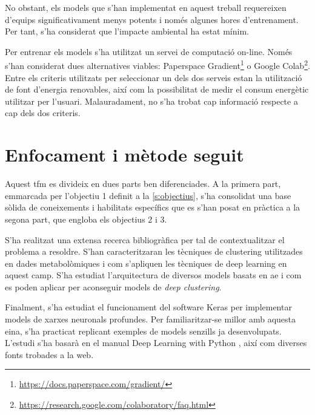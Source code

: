 \documentclass[CAT,BIB]{TFUOC}%
\begin{document}
            No obstant,
            els models que s’han implementat en aquest treball
            requereixen d’equips significativament menys potents
            i només algunes hores d’entrenament.
            Per tant, s’ha considerat que l’impacte ambiental ha estat mínim.

            Per entrenar els models s'ha utilitzat un servei de computació on-line.
            Només s'han considerat dues alternatives viables:
            Paperspace Gradient\footnote{\url{https://docs.paperspace.com/gradient/}}
            o Google Colab\footnote{\url{https://research.google.com/colaboratory/faq.html}}.
            Entre els criteris utilitzats per seleccionar un dels dos serveis
            estan la utilització de font d'energia renovables,
            així com la possibilitat de medir el consum energètic utilitzar per l'usuari.
            Malauradament,
            no s'ha trobat cap informació respecte a cap dels dos criteris.



    \section{Enfocament i mètode seguit}
    \label{s:enfocament}

        Aquest \gls{tfm} es divideix en dues parts ben diferenciades.
        A la primera part,
        emmarcada per l’objectiu 1
        definit a la \cref{s:objectius},
        s'ha consolidat una base sòlida de coneixements i habilitats específics
        que es s'han posat en pràctica a la segona part,
        que engloba els objectius 2 i 3.

        S'ha realitzat una extensa recerca bibliogràfica
        per tal de contextualitzar el problema a resoldre.
        S'han caracteritzaran les tècniques de clustering
        utilitzades en dades metabolòmiques i
        com s’apliquen les tècniques de deep learning en aquest camp.
        S’ha estudiat l’arquitectura de diversos models basats en \gls{ae}
        i com es poden aplicar per aconseguir models de \textit{deep clustering}.

        Finalment,
        s’ha estudiat el funcionament del software Keras \citep{Chollet2015} per
        implementar models de xarxes neuronals profundes.
        Per familiaritzar-se millor amb aquesta eina,
        s'ha practicat replicant exemples de models senzills ja desenvolupats.
        L’estudi s'ha basarà en el manual Deep Learning with Python \citep{Ketkar2021},
        així com diverses fonts trobades a la web.
\end{document}

